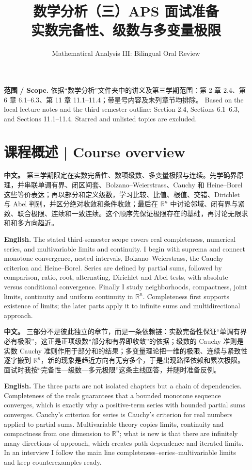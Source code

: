 \documentclass[UTF8,11pt,a4paper]{ctexart}
\title{数学分析（三）APS 面试准备\\[4pt]\large 实数完备性、级数与多变量极限}
\author{Mathematical Analysis III: Bilingual Oral Review}
\date{}
\newcommand{\APS}[2]{\par\noindent\textbf{中文。} #1\par\noindent\textbf{English.} #2\par\smallskip}
\begin{document}
\maketitle

{\footnotesize\noindent\textbf{范围 / Scope.} 依据“数学分析”文件夹中的讲义及第三学期范围：第 2 章 2.4、第 6 章 6.1--6.3、第 11 章 11.1--11.4；带星号内容及未列章节均排除。 Based on the local lecture notes and the third-semester outline: Section 2.4, Sections 6.1--6.3, and Sections 11.1--11.4. Starred and unlisted topics are excluded.\par}

\section*{课程概述 | Course overview}
\APS{第三学期限定在实数完备性、数项级数、多变量极限与连续。先学确界原理，并串联单调有界、闭区间套、Bolzano--Weierstrass、Cauchy 和 Heine--Borel 这些等价表达；再以部分和定义级数，学习比较、比值、根值、交错、Dirichlet 与 Abel 判别，并区分绝对收敛和条件收敛；最后在 $\mathbb R^n$ 中讨论邻域、闭有界与紧致、联合极限、连续和一致连续。这个顺序先保证极限存在的基础，再讨论无限求和和多方向趋近。}{The stated third-semester scope covers real completeness, numerical series, and multivariable limits and continuity. I begin with suprema and connect monotone convergence, nested intervals, Bolzano--Weierstrass, the Cauchy criterion and Heine--Borel. Series are defined by partial sums, followed by comparison, ratio, root, alternating, Dirichlet and Abel tests, with absolute versus conditional convergence. Finally I study neighborhoods, compactness, joint limits, continuity and uniform continuity in $\mathbb R^n$. Completeness first supports existence of limits; the later parts apply it to infinite sums and multidirectional approach.}
\APS{三部分不是彼此独立的章节，而是一条依赖链：实数完备性保证“单调有界必有极限”，这正是正项级数“部分和有界即收敛”的依据；级数的 Cauchy 准则是实数 Cauchy 准则作用于部分和的结果；多变量理论把一维的极限、连续与紧致性逐字搬到 $\mathbb R^n$，新的现象是趋近方向有无穷多个，于是出现路径依赖和累次极限。面试时我按“完备性—级数—多元极限”这条主线回答，并随时准备反例。}{The three parts are not isolated chapters but a chain of dependencies. Completeness of the reals guarantees that a bounded monotone sequence converges, which is exactly why a positive-term series with bounded partial sums converges. Cauchy's criterion for series is Cauchy's criterion for real numbers applied to partial sums. Multivariable theory copies limits, continuity and compactness from one dimension to $\mathbb R^n$; what is new is that there are infinitely many directions of approach, which creates path dependence and iterated limits. In an interview I follow the main line completeness--series--multivariable limits and keep counterexamples ready.}
\end{document}
